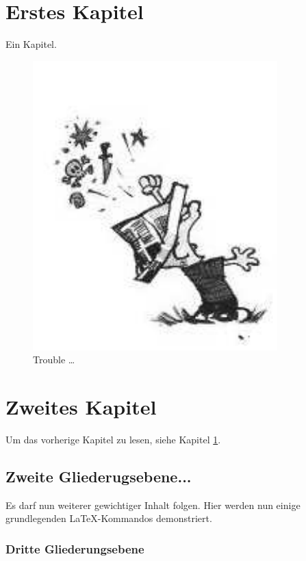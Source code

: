 
\chapter{Erstes Kapitel}
\label{sec:first}

Ein Kapitel.

\begin{figure}[htb] %
\centering
\includegraphics{Images/Chapter/trouble}
\caption{Trouble \ldots}
\label{fig:trouble}
\end{figure}

\blindtext\blindtext

\blindtext


\chapter{Zweites Kapitel}
Um das vorherige Kapitel zu lesen, siehe Kapitel \ref{sec:first}.


\section{Zweite Gliederugsebene...}

Es darf nun weiterer gewichtiger Inhalt folgen.
Hier werden nun einige grundlegenden \LaTeX-Kommandos demonstriert.

\subsection{Dritte Gliederungsebene}

